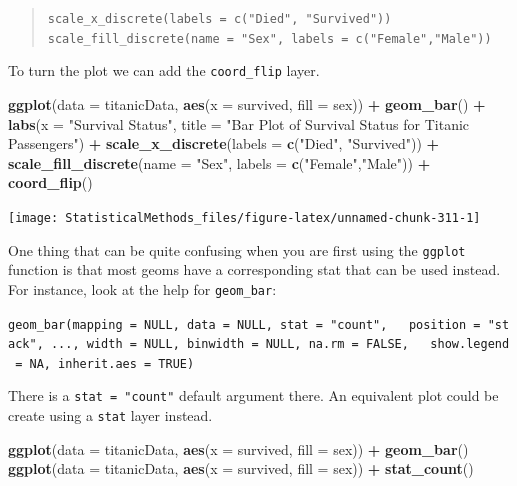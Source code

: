 \documentclass[
]{book}
\newenvironment{Shaded}{\begin{snugshade}}{\end{snugshade}}
\newcommand{\DataTypeTok}[1]{\textcolor[rgb]{0.13,0.29,0.53}{#1}}
\newcommand{\KeywordTok}[1]{\textcolor[rgb]{0.13,0.29,0.53}{\textbf{#1}}}
\newcommand{\NormalTok}[1]{#1}
\newcommand{\OperatorTok}[1]{\textcolor[rgb]{0.81,0.36,0.00}{\textbf{#1}}}
\newcommand{\StringTok}[1]{\textcolor[rgb]{0.31,0.60,0.02}{#1}}
\theoremstyle{definition}
\theoremstyle{definition}
\theoremstyle{definition}
\theoremstyle{remark}
\begin{document}
\begin{quote}
\texttt{scale\_x\_discrete(labels\ =\ c("Died",\ "Survived"))}
\texttt{scale\_fill\_discrete(name\ =\ "Sex",\ labels\ =\ c("Female","Male"))}
\end{quote}

To turn the plot we can add the \texttt{coord\_flip} layer.

\begin{Shaded}
\begin{Highlighting}[]
\KeywordTok{ggplot}\NormalTok{(}\DataTypeTok{data =}\NormalTok{ titanicData, }\KeywordTok{aes}\NormalTok{(}\DataTypeTok{x =}\NormalTok{ survived, }\DataTypeTok{fill =}\NormalTok{ sex)) }\OperatorTok{+}\StringTok{ }\KeywordTok{geom_bar}\NormalTok{() }\OperatorTok{+}
\StringTok{  }\KeywordTok{labs}\NormalTok{(}\DataTypeTok{x =} \StringTok{"Survival Status"}\NormalTok{, }
       \DataTypeTok{title =} \StringTok{"Bar Plot of Survival Status for Titanic Passengers"}\NormalTok{) }\OperatorTok{+}\StringTok{ }
\StringTok{  }\KeywordTok{scale_x_discrete}\NormalTok{(}\DataTypeTok{labels =} \KeywordTok{c}\NormalTok{(}\StringTok{"Died"}\NormalTok{, }\StringTok{"Survived"}\NormalTok{)) }\OperatorTok{+}\StringTok{ }
\StringTok{  }\KeywordTok{scale_fill_discrete}\NormalTok{(}\DataTypeTok{name =} \StringTok{"Sex"}\NormalTok{, }\DataTypeTok{labels =} \KeywordTok{c}\NormalTok{(}\StringTok{"Female"}\NormalTok{,}\StringTok{"Male"}\NormalTok{)) }\OperatorTok{+}\StringTok{ }
\StringTok{  }\KeywordTok{coord_flip}\NormalTok{()}
\end{Highlighting}
\end{Shaded}

\begin{center}\texttt{[image: StatisticalMethods\_files/figure-latex/unnamed-chunk-311-1]} \end{center}

One thing that can be quite confusing when you are first using the \texttt{ggplot} function is that most geoms have a corresponding stat that can be used instead. For instance, look at the help for \texttt{geom\_bar}:

\texttt{geom\_bar(mapping\ =\ NULL,\ data\ =\ NULL,\ stat\ =\ "count",\ \ \ position\ =\ "stack",\ ...,\ width\ =\ NULL,\ binwidth\ =\ NULL,\ na.rm\ =\ FALSE,\ \ \ show.legend\ =\ NA,\ inherit.aes\ =\ TRUE)}

There is a \texttt{stat\ =\ "count"} default argument there. An equivalent plot could be create using a \texttt{stat} layer instead.

\begin{Shaded}
\begin{Highlighting}[]
\KeywordTok{ggplot}\NormalTok{(}\DataTypeTok{data =}\NormalTok{ titanicData, }\KeywordTok{aes}\NormalTok{(}\DataTypeTok{x =}\NormalTok{ survived, }\DataTypeTok{fill =}\NormalTok{ sex)) }\OperatorTok{+}\StringTok{ }\KeywordTok{geom_bar}\NormalTok{()}
\KeywordTok{ggplot}\NormalTok{(}\DataTypeTok{data =}\NormalTok{ titanicData, }\KeywordTok{aes}\NormalTok{(}\DataTypeTok{x =}\NormalTok{ survived, }\DataTypeTok{fill =}\NormalTok{ sex)) }\OperatorTok{+}\StringTok{ }\KeywordTok{stat_count}\NormalTok{() }
\end{Highlighting}
\end{Shaded}
\end{document}

